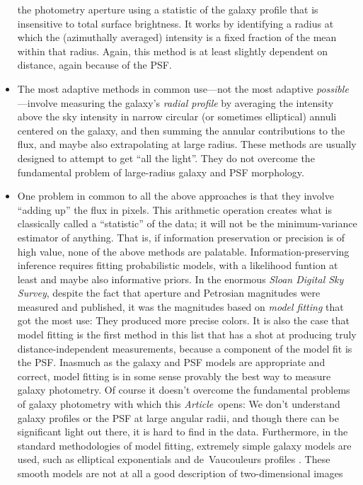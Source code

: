 \documentclass[12pt,preprint,pdftex]{aastex}
\newcommand{\project}[1]{\textsl{#1}}
\newcommand{\documentname}{\textsl{Article}}
\begin{document}
\begin{itemize}
  the photometry aperture using a statistic of the galaxy profile that
  is insensitive to total surface brightness.  It works by identifying
  a radius at which the (azimuthally averaged) intensity is a fixed
  fraction of the mean within that radius.  Again, this method is at
  least slightly dependent on distance, again because of the PSF.
\item The most adaptive methods in common use---not the most adaptive
  \emph{possible}---involve measuring the galaxy's \emph{radial
    profile} by averaging the intensity above the sky intensity in
  narrow circular (or sometimes elliptical) annuli centered on the
  galaxy, and then summing the annular contributions to the flux, and
  maybe also extrapolating at large radius.  These methods are usually
  designed to attempt to get ``all the light''.  They do not overcome
  the fundamental problem of large-radius galaxy and PSF morphology.
\item One problem in common to all the above approaches is that they
  involve ``adding up'' the flux in pixels.  This arithmetic operation
  creates what is classically called a ``statistic'' of the data; it
  will not be the minimum-variance estimator of anything.  That is, if
  information preservation or precision is of high value, none of the
  above methods are palatable.  Information-preserving inference
  requires fitting probabilistic models, with a likelihood funtion at
  least and maybe also informative priors.  In the enormous
  \project{Sloan Digital Sky Survey}, despite the fact that aperture
  and Petrosian magnitudes were measured and published, it was the
  magnitudes based on \emph{model fitting} that got the most use: They
  produced more precise colors.  It is also the case that model
  fitting is the first method in this list that has a shot at
  producing truly distance-independent measurements, because a
  component of the model fit is the PSF.  Inasmuch as the galaxy and
  PSF models are appropriate and correct, model fitting is in some
  sense provably the best way to measure galaxy photometry.  Of course
  it doesn't overcome the fundamental problems of galaxy photometry
  with which this \documentname\ opens: We don't understand galaxy
  profiles or the PSF at large angular radii, and though there can be
  significant light out there, it is hard to find in the data.
  Furthermore, in the standard methodologies of model fitting,
  extremely simple galaxy models are used, such as elliptical
  exponentials and de~Vaucouleurs profiles \citep{dev}.  These smooth
  models are not at all a good description of two-dimensional images

\end{itemize}
\end{document}
